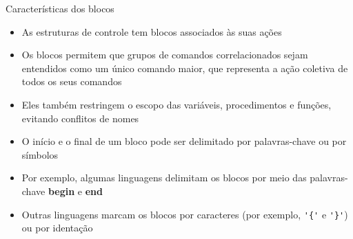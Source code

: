 \begin{frame}[fragile]{Características dos blocos}

    \begin{itemize}
        \item As estruturas de controle tem blocos associados às suas ações

        \item Os blocos permitem que grupos de comandos correlacionados sejam entendidos como
            um único comando maior, que representa a ação coletiva de todos os seus comandos

        \item Eles também restringem o escopo das variáveis, procedimentos e funções, evitando
            conflitos de nomes

        \item O início e o final de um bloco pode ser delimitado por palavras-chave ou por 
            símbolos

        \item Por exemplo, algumas linguagens delimitam os blocos por meio das palavras-chave 
            \textbf{begin} e \textbf{end}

        \item Outras linguagens marcam os blocos por caracteres (por exemplo, \verb|'{'| e 
            \verb|'}'|) ou por identação
    \end{itemize}

\end{frame}
